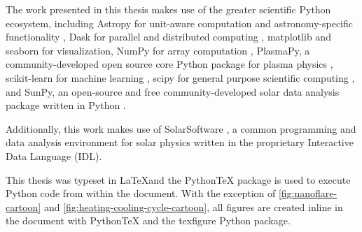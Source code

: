 The work presented in this thesis makes use of the greater scientific Python ecosystem, including Astropy for unit-aware computation and astronomy-specific functionality \citep{the_astropy_collaboration_astropy_2018}, Dask for parallel and distributed computing \citep{rocklin_dask_2015-1}, matplotlib \citep{hunter_matplotlib_2007} and seaborn \citep{waskom_seaborn_2018} for visualization, NumPy for array computation \citep{oliphant_guide_2006}, PlasmaPy, a community-developed open source core Python package for plasma physics \citep{plasmapy_community_2018_1238132}, scikit-learn for machine learning \citep{pedregosa_scikit-learn_2011}, scipy for general purpose scientific computing \citep[e.g. interpolation, curve fitting, special functions][]{jones_scipy_2001}, and SunPy, an open-source and free community-developed solar data analysis package written in Python \citep{sunpy_community_sunpypython_2015}.

Additionally, this work makes use of SolarSoftware \citep[SSW,][]{freeland_data_1998}, a common programming and data analysis environment for solar physics written in the proprietary Interactive Data Language (IDL).

This thesis was typeset in \LaTeX and the Python\TeX{} package is used to execute Python code from within the document. With the exception of \autoref{fig:nanoflare-cartoon} and \autoref{fig:heating-cooling-cycle-cartoon}, all figures are created inline in the document with Python\TeX{} and the texfigure Python package.

